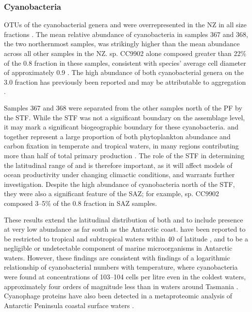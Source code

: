 \subsubsection{Cyanobacteria}

\acp{OTU} of the cyanobacterial genera  and  were overrepresented in the \ac{NZ} in all size fractions .
The mean relative abundance of cyanobacteria in samples 367 and 368, the two northernmost samples, was strikingly higher than the mean abundance across all other samples in the \ac{NZ}.
 sp. CC9902 alone composed greater than 22\% of the 0.8 \micron{} fraction in these samples, consistent with  species' average cell diameter of approximately 0.9 \micron.
The high abundance of both cyanobacterial genera on the 3.0 \micron{} fraction has previously been reported \cite{Lauro:2010jna} and may be attributable to aggregation \cite{Lomas:2011bp}.

Samples 367 and 368 were separated from the other samples north of the \ac{PF} by the \ac{STF}.
While the \ac{STF} was not a significant boundary on the assemblage level, it may mark a significant biogeographic boundary for these cyanobacteria.
 and  together represent a large proportion of both phytoplankton abundance and carbon fixation in temperate and tropical waters, in many regions contributing more than half of total primary production \cite{Liu:1997ub,Liu:1998tk,Andre:1999uh}.
The role of the \ac{STF} in determining the latitudinal range of  and  is therefore important, as it will affect models of ocean productivity under changing climactic conditions, and warrants further investigation.
Despite the high abundance of cyanobacteria north of the \ac{STF}, they were also a significant feature of the \ac{SAZ}; for example,  sp. CC9902 composed 3--5\% of the 0.8 \micron{} fraction in \ac{SAZ} samples.

These results extend the latitudinal distribution of both  and  to include presence at very low abundance as far south as the Antarctic coast.
 have been reported to be restricted to tropical and subtropical waters within 40\textdegree{} of latitude \cite{Partensky:1999uf}, and to be a negligible \cite{Ghiglione:2011ee} or undetectable \cite{Grzymski:2012ej} component of marine microorganisms in Antarctic waters.
However, these findings are consistent with findings of a logarithmic relationship of cyanobacterial numbers with temperature, where cyanobacteria were found at concentrations of 103--104 cells per litre even in the coldest waters, approximately four orders of magnitude less than in waters around Tasmania \cite{Marchant:1987wv}.
Cyanophage proteins have also been detected in a metaproteomic analysis of Antarctic Peninsula coastal surface waters \cite{Williams:2012bs}.

